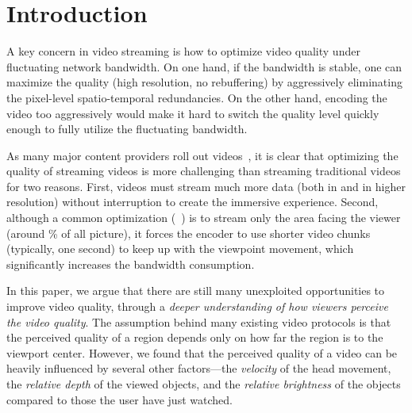 
\section{Introduction}


A key concern in video streaming is how to optimize video quality under fluctuating network bandwidth.
On one hand, if the bandwidth is stable, one can maximize the quality (\eg high resolution, no rebuffering) by aggressively eliminating the pixel-level spatio-temporal redundancies.
On the other hand, encoding the video too aggressively would make it hard to switch the quality level quickly enough to fully utilize the fluctuating bandwidth.

As many major content providers roll out \vr videos~\cite{??,??,??,??,??}, 
it is clear that optimizing the quality of streaming \vr videos is more challenging than streaming traditional videos for two reasons.
First, \vr videos must stream much more data (both in \vr and in higher resolution) without interruption to create the immersive experience.
Second, although a common optimization (\eg~\cite{??,??,??}) is to stream only the area facing the viewer (around \fillme\% of all picture), it forces the encoder to use shorter video chunks (typically, one second) to keep up with the viewpoint movement, which significantly increases the bandwidth consumption.


In this paper, we argue that there are still many unexploited opportunities to improve \vr video quality, through a {\em deeper understanding of how viewers perceive the \vr video quality}.
The assumption behind many existing \vr video protocols is that the perceived quality of a region depends only on how far the region is to the viewport center.
However, we found that the perceived quality of a \vr video can be heavily influenced by several other factors---the {\em velocity} of the head movement, the {\em relative depth} of the viewed objects, and the {\em relative brightness} of the objects compared to those the user have just watched. 

